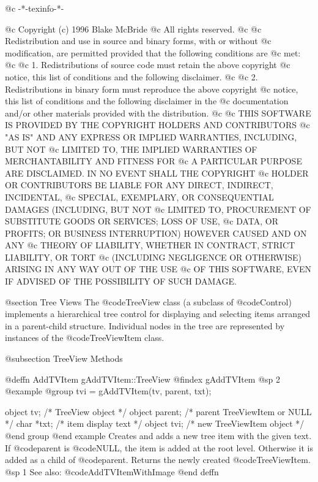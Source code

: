 @c -*-texinfo-*-

@c  Copyright (c) 1996 Blake McBride
@c  All rights reserved.
@c
@c  Redistribution and use in source and binary forms, with or without
@c  modification, are permitted provided that the following conditions are
@c  met:
@c
@c  1. Redistributions of source code must retain the above copyright
@c  notice, this list of conditions and the following disclaimer.
@c
@c  2. Redistributions in binary form must reproduce the above copyright
@c  notice, this list of conditions and the following disclaimer in the
@c  documentation and/or other materials provided with the distribution.
@c
@c  THIS SOFTWARE IS PROVIDED BY THE COPYRIGHT HOLDERS AND CONTRIBUTORS
@c  "AS IS" AND ANY EXPRESS OR IMPLIED WARRANTIES, INCLUDING, BUT NOT
@c  LIMITED TO, THE IMPLIED WARRANTIES OF MERCHANTABILITY AND FITNESS FOR
@c  A PARTICULAR PURPOSE ARE DISCLAIMED. IN NO EVENT SHALL THE COPYRIGHT
@c  HOLDER OR CONTRIBUTORS BE LIABLE FOR ANY DIRECT, INDIRECT, INCIDENTAL,
@c  SPECIAL, EXEMPLARY, OR CONSEQUENTIAL DAMAGES (INCLUDING, BUT NOT
@c  LIMITED TO, PROCUREMENT OF SUBSTITUTE GOODS OR SERVICES; LOSS OF USE,
@c  DATA, OR PROFITS; OR BUSINESS INTERRUPTION) HOWEVER CAUSED AND ON ANY
@c  THEORY OF LIABILITY, WHETHER IN CONTRACT, STRICT LIABILITY, OR TORT
@c  (INCLUDING NEGLIGENCE OR OTHERWISE) ARISING IN ANY WAY OUT OF THE USE
@c  OF THIS SOFTWARE, EVEN IF ADVISED OF THE POSSIBILITY OF SUCH DAMAGE.



@section Tree Views
The @code{TreeView} class (a subclass of @code{Control}) implements a
hierarchical tree control for displaying and selecting items arranged in
a parent-child structure.  Individual nodes in the tree are represented
by instances of the @code{TreeViewItem} class.

@subsection TreeView Methods



@deffn {AddTVItem} gAddTVItem::TreeView
@findex gAddTVItem
@sp 2
@example
@group
tvi = gAddTVItem(tv, parent, txt);

object  tv;       /*  TreeView object          */
object  parent;   /*  parent TreeViewItem or NULL  */
char    *txt;     /*  item display text         */
object  tvi;      /*  new TreeViewItem object   */
@end group
@end example
Creates and adds a new tree item with the given text.  If @code{parent}
is @code{NULL}, the item is added at the root level.  Otherwise it is
added as a child of @code{parent}.  Returns the newly created
@code{TreeViewItem}.
@sp 1
See also:  @code{AddTVItemWithImage}
@end deffn



